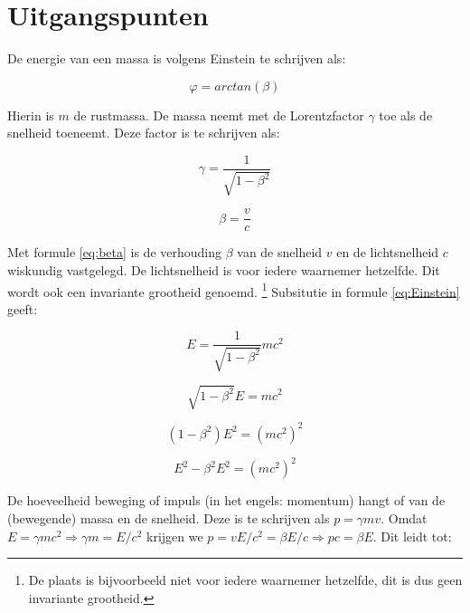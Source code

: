 \section{\label{sec:Uitgangspunten}Uitgangspunten}
\begin{multicols}{2}

De energie van een massa is volgens Einstein te schrijven als:

\begin{equation}
\varphi=arctan(\beta)
\end{equation}


Hierin is $m$ de rustmassa. De massa neemt met de Lorentzfactor $\gamma$
toe als de snelheid toeneemt. Deze factor is te schrijven als: 

\begin{equation}
\gamma=\frac{1}{\sqrt{1-\beta^{2}}}
\end{equation}


\begin{equation}
\beta=\frac{v}{c}\label{eq:beta}
\end{equation}


Met formule \ref{eq:beta} is de verhouding $\beta$ van de snelheid
$v$ en de lichtsnelheid $c$ wiskundig vastgelegd. De lichtsnelheid
is voor iedere waarnemer hetzelfde. Dit wordt ook een invariante grootheid
genoemd.%
\footnote{De plaats is bijvoorbeeld niet voor iedere waarnemer hetzelfde, dit
is dus geen invariante grootheid.%
} Subsitutie in formule \ref{eq:Einstein} geeft:

\begin{equation}
E=\frac{1}{\sqrt{1-\beta^{2}}}mc^{2}
\end{equation}

\begin{equation}
\sqrt{1-\beta^{2}}E=mc^{2}
\end{equation}

\begin{equation}
\left(1-\beta^{2}\right)E^{2}=\left(mc^{2}\right)^{2}
\end{equation}

\begin{equation}
E^{2}-\beta^{2}E^{2}=\left(mc^{2}\right)^{2}
\end{equation}

De hoeveelheid beweging of impuls (in het engels: momentum) hangt
of van de (bewegende) massa en de snelheid. Deze is te schrijven als $p=\gamma mv$.
Omdat $E=\gamma mc^{2}\Rightarrow\gamma m=E/c^{2}$ krijgen we $p=vE/c^{2}=\beta E/c\Rightarrow pc=\beta E$.
Dit leidt tot:


\end{multicols}
